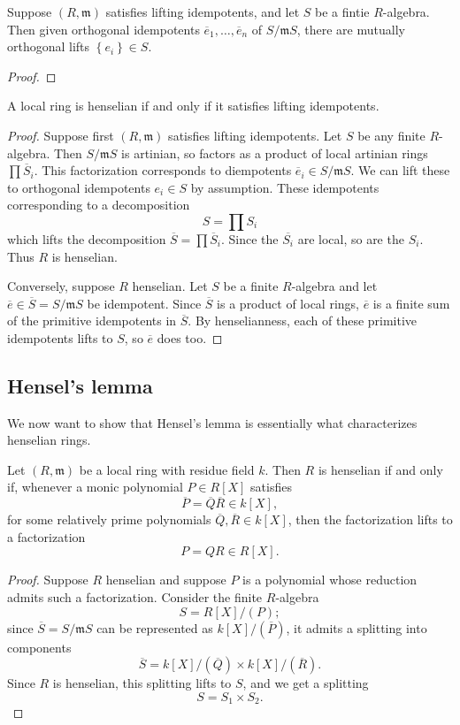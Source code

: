 \begin{proposition} 
Suppose $(R, \mathfrak{m})$ satisfies lifting idempotents, and let $S$ be a
fintie $R$-algebra. Then given
orthogonal idempotents $\overline{e}_1, \dots, \overline{e}_n$ of $S/\mathfrak{m}S$, there are
mutually orthogonal lifts $\left\{e_i\right\} \in S$.
\end{proposition} 
\begin{proof} 

\end{proof} 

\begin{proposition} 
A local ring is henselian if and only if it satisfies lifting idempotents. 
\end{proposition}
\begin{proof} 
Suppose first $(R, \mathfrak{m} )$ satisfies lifting idempotents. 
Let $S$ be any finite $R$-algebra. Then $S/\mathfrak{m}S$ is artinian,
so factors as a product of local artinian rings $\prod \overline{S}_i$. This
factorization corresponds to diempotents $\overline{e}_i \in
S/\mathfrak{m}S$.
We can lift these to orthogonal idempotents $e_i \in S$ by assumption. 
These idempotents corresponding to a decomposition 
\[ S = \prod S_i  \]
which lifts the decomposition $\overline{S} = \prod \overline{S}_i$. Since the
$\overline{S_i}$ are local, so are the $S_i$.
Thus $R$ is henselian.

Conversely, suppose $R$ henselian. 
Let $S$ be a finite $R$-algebra and let $\overline{e} \in \overline{S} =
S/\mathfrak{m}S$ be idempotent. Since $\overline{S}$ is a product of local
rings, $\overline{e}$ is a finite sum of the primitive idempotents in
$\overline{S}$. By henselianness, each of these primitive idempotents lifts to
$S$, so $\overline{e}$ does too.
\end{proof}


\subsection{Hensel's lemma}

We now want to show that Hensel's lemma is essentially what characterizes
henselian rings.

\begin{proposition} 
Let $(R, \mathfrak{m})$ be a local ring with residue field $k$. Then $R$ is henselian if and only if,
whenever a monic polynomial $P \in R[X]$ satisfies
\[ \overline{P} = \overline{Q}\overline{R} \in k[X], \]
for some relatively prime polynomials $\overline{Q}, \overline{R} \in k[X]$,
then the factorization lifts to a factorization 
\[ P = QR \in R[X].  \]
\end{proposition} 
\begin{proof} 
Suppose $R$ henselian and suppose $P$ is a polynomial whose reduction admits
such a factorization.
Consider the finite $R$-algebra
\[ S = R[X]/(P);  \]
since $\overline{S } = S/\mathfrak{m}S $ can be represented as
$k[X]/(\overline{P})$, it admits a splitting into components
\[ \overline{S} = k[X]/(\overline{Q}) \times k[X]/(\overline{R}).  \]
Since $R$ is henselian, this splitting lifts to $S$, and we get a splitting
\[ S = S_1 \times S_2.  \]
\end{proof} 
